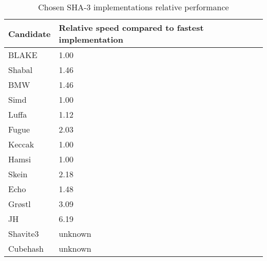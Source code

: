 \begin{table}
  \centering
  \caption{Chosen SHA-3 implementations relative performance}
  \begin{tabular}{ | l | p{6cm} | r | }
    \hline
    \textbf{Candidate} & \textbf{Relative speed compared to fastest implementation} \\ \hline
     BLAKE      & 1.00                   \\ \hline
     Shabal     & 1.46                   \\ \hline
     \ac{BMW}   & 1.46                   \\ \hline
     Simd       & 1.00                   \\ \hline
     Luffa      & 1.12                   \\ \hline
     Fugue      & 2.03                   \\ \hline
     Keccak     & 1.00                   \\ \hline
     Hamsi      & 1.00                   \\ \hline
     Skein      & 2.18                   \\ \hline
     Echo       & 1.48                   \\ \hline
     Grøstl    & 3.09                   \\ \hline
     JH         & 6.19                   \\ \hline
     Shavite3   & unknown                \\ \hline
     Cubehash   & unknown                \\ \hline
  \end{tabular}
  \label{tbl:sha3:speedrelative}
\end{table}
